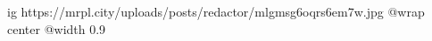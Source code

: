  
 
 
 
 

\ifcmt
  ig https://mrpl.city/uploads/posts/redactor/mlgmsg6oqrs6em7w.jpg
  @wrap center
  @width 0.9
\fi
